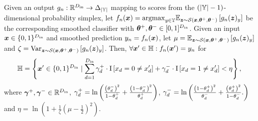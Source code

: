 \begin{corollary} \label{prop-appendix-sparsity-aware-var-smoothing}
Given an output $g_n : {\mathbb{R}}^{D_\mathrm{in}} \rightarrow \Delta_{|{\mathbb{Y}}|}$ mapping to scores from the $\left(|{\mathbb{Y}}|-1\right)$-dimensional probability simplex, let 
$f_n({\bm{x}}) = \mathrm{argmax}_{y \in {\mathbb{Y}}}
\mathbb{E}_{{\bm{z}} \sim \mathcal{S}({\bm{x}}, {\bm{\theta}}^+, {\bm{\theta}}^-)}
\left[g_n({\bm{z}})_y\right]$ be the corresponding smoothed classifier with ${\bm{\theta}}^+,  {\bm{\theta}}^- \in [0,1]^{D_\mathrm{in}}$.
Given an input ${\bm{x}} \in \{0,1\}^{D_\mathrm{in}}$ and smoothed prediction ${y}_n = f_n({\bm{x}})$, 
let $\mu = \mathbb{E}_{{\bm{z}} \sim \mathcal{S}({\bm{x}}, {\bm{\theta}}^+, {\bm{\theta}}^-)}\left[g_n({\bm{z}})_y\right]$
and $\zeta = \mathrm{Var}_{{\bm{z}} \sim \mathcal{S}({\bm{x}}, {\bm{\theta}}^+, {\bm{\theta}}^-)}\left[g_n({\bm{z}})_y\right]$.
Then, $\forall {\bm{x}}' \in {\mathbb{H}} : f_n({\bm{x}}') = y_n$ for
\begin{equation}
\begin{split}
    {\mathbb{H}} = \left\{ {\bm{x}}' \in \{0,1\}^{D_\mathrm{in}} \mid
        \sum_{d=1}^{D_\mathrm{in}}
            {\gamma}_d^{+} \cdot \mathrm{I}\left[{x}_d = 0 \neq {x}'_d\right]  + 
            {\gamma}_d^{-} \cdot \mathrm{I}\left[{x}_d = 1 \neq {x}'_d\right]  
            <
            \eta
    \right\},
\end{split}
\end{equation}
where ${\bm{\gamma}}^+, {\bm{\gamma}}^- \in {\mathbb{R}}^{D_\mathrm{in}}$,
${\gamma}^+_d = \ln\left( \frac{\left({\theta}^{-}_d\right)^2}{1 - {\theta}^{+}_d}
     +
     \frac{\left(1 - {\theta}^{-}_d\right)^2}{{\theta}^{+}_d}
\right)$,
${\gamma}^-_d = \ln\left( \frac{\left(1 - {\theta}^{+}_d\right)^2}{{\theta}^{-}_d}
+ \frac{\left({\theta}^{+}_d\right)^2}{1 - {\theta}^{-}_d}.
\right)$
and
$\eta = \ln\left(1 + \frac{1}{\zeta}\left(\mu - \frac{1}{2}\right)^2\right)$.
\end{corollary}
